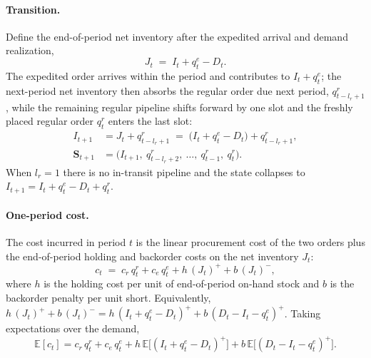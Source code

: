 \documentclass[11pt]{article}
\begin{document}
\paragraph{Transition.}
Define the end-of-period net inventory after the expedited arrival and demand realization,
\begin{equation*}
    J_t \;=\; I_t + q^e_t - D_t .
\end{equation*}
The expedited order arrives within the period and contributes to $I_t+q^e_t$; the next-period net
inventory then absorbs the regular order due next period, $q^r_{t-l_r+1}$, while the remaining
regular pipeline shifts forward by one slot and the freshly placed regular order $q^r_t$ enters the
last slot:
\begin{align*}
    I_{t+1} &= J_t + q^r_{t-l_r+1} \;=\; \bigl(I_t+q^e_t-D_t\bigr) + q^r_{t-l_r+1},\\
    \mathbf{S}_{t+1} &= \bigl(I_{t+1},\ q^r_{t-l_r+2},\ \dots,\ q^r_{t-1},\ q^r_t\bigr).
\end{align*}
When $l_r=1$ there is no in-transit pipeline and the state collapses to
$I_{t+1}=I_t+q^e_t-D_t+q^r_t$.

\paragraph{One-period cost.}
The cost incurred in period $t$ is the linear procurement cost of the two orders plus the
end-of-period holding and backorder costs on the net inventory $J_t$:
\begin{equation}
    \label{ds_cost}
    c_t \;=\; c_r\,q^r_t + c_e\,q^e_t + h\,(J_t)^+ + b\,(J_t)^- ,
\end{equation}
where $h$ is the holding cost per unit of end-of-period on-hand stock and $b$ is the backorder
penalty per unit short. Equivalently, $h\,(J_t)^+ + b\,(J_t)^- = h\,(I_t+q^e_t-D_t)^+ +
b\,(D_t-I_t-q^e_t)^+$. Taking expectations over the demand,
\begin{equation*}
    \mathbb{E}[c_t] = c_r\,q^r_t + c_e\,q^e_t
    + h\,\mathbb{E}\bigl[(I_t+q^e_t-D_t)^+\bigr]
    + b\,\mathbb{E}\bigl[(D_t-I_t-q^e_t)^+\bigr].
\end{equation*}
\end{document}
